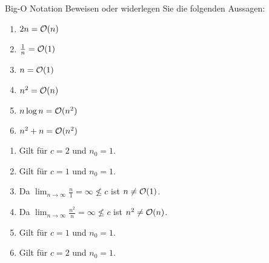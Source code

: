 \documentclass{article}
\begin{document}
\begin{exercise}{Big-O Notation}
  Beweisen oder widerlegen Sie die folgenden Aussagen:
  \begin{enumerate}
    \item $2n = \mathcal{O}(n)$
    \item $\frac{1}{n} = \mathcal{O}(1)$
    \item $n = \mathcal{O}(1)$
    \item $n^2 = \mathcal{O}(n)$
    \item $n \log n = \mathcal{O}(n^2)$
    \item $n^2 + n = \mathcal{O}(n^2)$
  \end{enumerate}

  \begin{solution}
    \begin{enumerate}
      \item Gilt für $c = 2$ und $n_0 = 1$.
      \item Gilt für $c = 1$ und $n_0 = 1$.
      \item Da $\lim_{n\to\infty} \frac{n}{1} = \infty \not\le c$ ist $n \neq \mathcal{O}(1)$.
      \item Da $\lim_{n\to\infty} \frac{n^2}{n} = \infty \not\le c$ ist $n^2 \neq \mathcal{O}(n)$.
      \item Gilt für $c = 1$ und $n_0 = 1$.
      \item Gilt für $c = 2$ und $n_0 = 1$.
    \end{enumerate}
  \end{solution}
\end{exercise}
\end{document}
